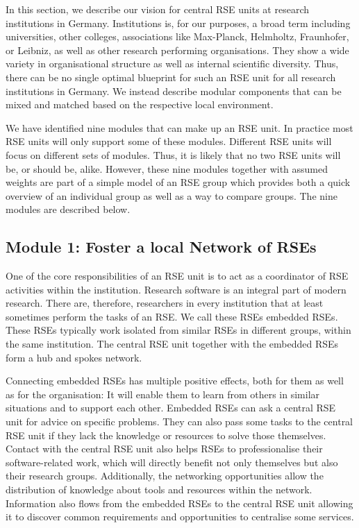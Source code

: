 \documentclass[a4paper]{article}
\begin{document}
In this section, we describe our vision for central RSE units at research institutions in Germany.
Institutions is, for our purposes, a broad term including universities, other colleges, associations like Max-Planck, Helmholtz, Fraunhofer, or Leibniz, as well as other research performing organisations.
They show a wide variety in organisational structure as well as internal scientific diversity.
Thus, there can be no single optimal blueprint for such an RSE unit for all research institutions in Germany.
We instead describe modular components that can be mixed and matched based on the respective local environment.

We have identified nine modules that can make up an RSE unit.
In practice most RSE units will only support some of these modules.
Different RSE units will focus on different sets of modules.
Thus, it is likely that no two RSE units will be, or should be, alike.
However, these nine modules together with assumed weights are part of a simple model of an RSE group which provides both a quick overview of an individual group as well as a way to compare groups.
The nine modules are described below.

\subsection{Module 1: Foster a local Network of RSEs}%
\label{sec:network}

One of the core responsibilities of an RSE unit is to act as a coordinator of RSE activities within the institution.
Research software is an integral part of modern research. 
There are, therefore, researchers in every institution that at least sometimes perform the tasks of an RSE\@.
We call these RSEs embedded RSEs.
These RSEs typically work isolated from similar RSEs in different groups, within the same institution.
The central RSE unit together with the embedded RSEs form a hub and spokes network.

Connecting embedded RSEs has multiple positive effects, both for them as well as for the organisation:
It will enable them to learn from others in similar situations and to support each other.
Embedded RSEs can ask a central RSE unit for advice on specific problems.
They can also pass some tasks to the central RSE unit if they lack the knowledge or resources to solve those themselves.
Contact with the central RSE unit also helps RSEs to professionalise their software-related work, which will directly benefit not only themselves but also their research groups.
Additionally, the networking opportunities allow the distribution of knowledge about tools and resources within the network.
Information also flows from the embedded RSEs to the central RSE unit allowing it to discover common requirements and opportunities to centralise some services.
\end{document}
